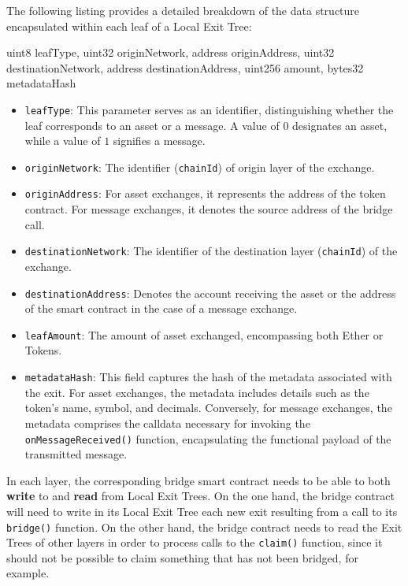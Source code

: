 The following listing provides a detailed breakdown of the data structure encapsulated within each leaf of a Local Exit Tree:

\vspace{1em}

\begin{solidity}
uint8 leafType,
uint32 originNetwork,
address originAddress,
uint32 destinationNetwork,
address destinationAddress,
uint256 amount,
bytes32 metadataHash
\end{solidity}

\begin{itemize}

\item \texttt{leafType}: This parameter serves as an identifier, distinguishing whether the leaf corresponds to an asset or a message. A value of $0$ designates an asset, while a value of $1$ signifies a message.

\item \texttt{originNetwork}: The identifier (\texttt{chainId}) of origin layer of the exchange.

\item \texttt{originAddress}: For asset exchanges, it represents the address of the token contract. For message exchanges, it denotes the source address of the bridge call.

\item \texttt{destinationNetwork}: The identifier of the destination layer (\texttt{chainId}) of the exchange.

\item  \texttt{destinationAddress}: Denotes the account receiving the asset or the address of the smart contract in the case of a message exchange.

\item  \texttt{leafAmount}: The amount of asset exchanged, encompassing both Ether or Tokens.

\item  \texttt{metadataHash}: This field captures the hash of the metadata associated with the exit. For asset exchanges, the metadata includes details such as the token's name, symbol, and decimals. Conversely, for message exchanges, the metadata comprises the calldata necessary for invoking the \texttt{onMessageReceived()} function, encapsulating the functional payload of the transmitted message.

\end{itemize}

In each layer, the corresponding bridge smart contract needs to be able to both \textbf{write} to and \textbf{read} from Local Exit Trees. On the one hand, the bridge contract will need to write in its Local Exit Tree each new exit resulting from a call to its \texttt{bridge()} function. On the other hand, the bridge contract needs to read the Exit Trees of other layers in order to process calls to the \texttt{claim()} function, since it should not be possible to claim something that has not been bridged, for example.

